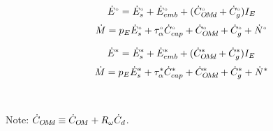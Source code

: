 


\begin{landscape}

\linespread{1}


\sectionsep{}

{
\begin{equation} \label{eq:E_acct_orig}
  \Eacctorig{}
\end{equation}
}
{
\begin{equation} \label{eq:M_acct_orig}
  \Macctorig{}
\end{equation}
}

\sectionsep{}

{
\begin{equation} \label{eq:E_acct_aemp}
  \Eacctaempl{}
\end{equation}
}
{
\begin{equation} \label{eq:M_acct_aemp}
  \Macctaempl{}
\end{equation}
}

\sectionsep{}

\derivsection{}
{
~

Note: $\rate{C}_{\omd} \equiv \rate{C}_{\om} + R_{\omega} \rate{C}_d$.

}
\end{landscape}
